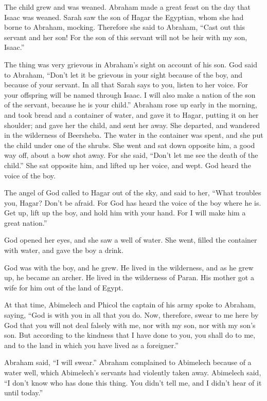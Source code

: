 \myverse{}The child grew and was weaned. Abraham made a great feast on the day that Isaac was weaned.  \myverse{}Sarah saw the son of Hagar the Egyptian, whom she had borne to Abraham, mocking. \myverse{}Therefore she said to Abraham, “Cast out this servant and her son! For the son of this servant will not be heir with my son, Isaac.”

\myverse{}The thing was very grievous in Abraham’s sight on account of his son.  \myverse{}God said to Abraham, “Don’t let it be grievous in your sight because of the boy, and because of your servant. In all that Sarah says to you, listen to her voice. For your offspring will be named through Isaac.  \myverse{}I will also make a nation of the son of the servant, because he is your child.”  \myverse{}Abraham rose up early in the morning, and took bread and a container of water, and gave it to Hagar, putting it on her shoulder; and gave her the child, and sent her away. She departed, and wandered in the wilderness of Beersheba.  \myverse{}The water in the container was spent, and she put the child under one of the shrubs.  \myverse{}She went and sat down opposite him, a good way off, about a bow shot away. For she said, “Don’t let me see the death of the child.” She sat opposite him, and lifted up her voice, and wept.  \myverse{}God heard the voice of the boy.

The angel of God called to Hagar out of the sky, and said to her, “What troubles you, Hagar? Don’t be afraid. For God has heard the voice of the boy where he is.  \myverse{}Get up, lift up the boy, and hold him with your hand. For I will make him a great nation.”

\myverse{}God opened her eyes, and she saw a well of water. She went, filled the container with water, and gave the boy a drink.

\myverse{}God was with the boy, and he grew. He lived in the wilderness, and as he grew up, he became an archer.  \myverse{}He lived in the wilderness of Paran. His mother got a wife for him out of the land of Egypt.

\myverse{}At that time, Abimelech and Phicol the captain of his army spoke to Abraham, saying, “God is with you in all that you do.  \myverse{}Now, therefore, swear to me here by God that you will not deal falsely with me, nor with my son, nor with my son’s son. But according to the kindness that I have done to you, you shall do to me, and to the land in which you have lived as a foreigner.”

\myverse{}Abraham said, “I will swear.”  \myverse{}Abraham complained to Abimelech because of a water well, which Abimelech’s servants had violently taken away.  \myverse{}Abimelech said, “I don’t know who has done this thing. You didn’t tell me, and I didn’t hear of it until today.”

